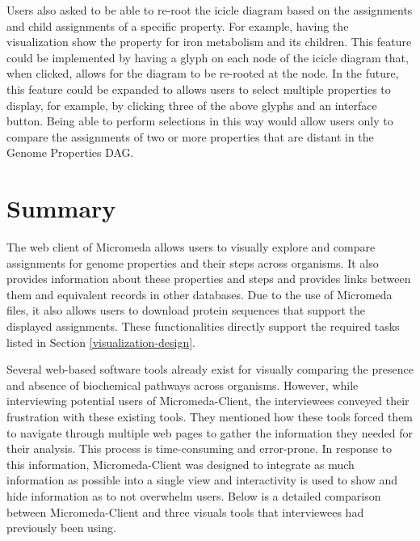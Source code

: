 Users also asked to be able to re-root the icicle diagram based on the assignments and child assignments of a specific property. For example, having the visualization show the property for iron metabolism and its children. This feature could be implemented by having a glyph on each node of the icicle diagram that, when clicked, allows for the diagram to be re-rooted at the node. In the future, this feature could be expanded to allows users to select multiple properties to display, for example, by clicking three of the above glyphs and an interface button. Being able to perform selections in this way would allow users only to compare the assignments of two or more properties that are distant in the Genome Properties DAG.

\section{Summary} \label{micromeda-client-summary}

The web client of Micromeda allows users to visually explore and compare assignments for genome properties and their steps across organisms. It also provides information about these properties and steps and provides links between them and equivalent records in other databases. Due to the use of Micromeda files, it also allows users to download protein sequences that support the displayed assignments. These functionalities directly support the required tasks listed in Section \ref{visualization-design}.

Several web-based software tools already exist for visually comparing the presence and absence of biochemical pathways across organisms. However, while interviewing potential users of Micromeda-Client, the interviewees conveyed their frustration with these existing tools. They mentioned how these tools forced them to navigate through multiple web pages to gather the information they needed for their analysis. This process is time-consuming and error-prone. In response to this information, Micromeda-Client was designed to integrate as much information as possible into a single view and interactivity is used to show and hide information as to not overwhelm users. Below is a detailed comparison between Micromeda-Client and three visuals tools that interviewees had previously been using.

